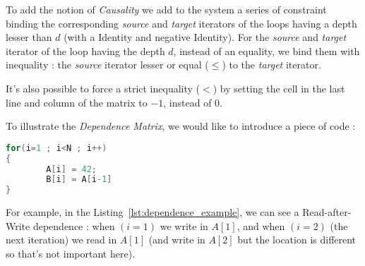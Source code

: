 \documentclass[paper=a4, fontsize=11pt]{scrartcl}
\numberwithin{equation}{section}        %
\numberwithin{figure}{section}          %
\numberwithin{table}{section}               %
\begin{document}
\begin{itemize}
                To add the notion of \textit{Causality} we add to the system a series of
                constraint binding the corresponding \textit{source} and \textit{target}
                iterators of the loops having a depth lesser than $d$
                (with a Identity and negative Identity).
                For the \textit{source} and \textit{target} iterator of the loop having
                the depth $d$, instead of an equality, we bind them with inequality :
                the \textit{source} iterator lesser or equal ($\leq$) to the \textit{target} iterator.

                It's also possible to force a strict inequality ($<$) by setting the cell
                in the last line and column of the matrix to $-1$, instead of $0$.
        \end{itemize}

        \medskip
        
        To illustrate the \textit{Dependence Matrix}, we would like to introduce a piece of code :
\begin{lstlisting}[frame=single, language=C, caption={Simple code for Dependence Relation example}, label={lst:dependence_example}]
for(i=1 ; i<N ; i++)
{
        A[i] = 42;
        B[i] = A[i-1]
}
\end{lstlisting}
        
        For example, in the Listing~\ref{lst:dependence_example}, we can see a Read-after-Write
        dependence : when $(i=1)$ we write in $A[1]$, and when $(i=2)$ (the next iteration)
        we read in $A[1]$ (and write in $A[2]$ but the location is different so that's not important here).
\end{document}
